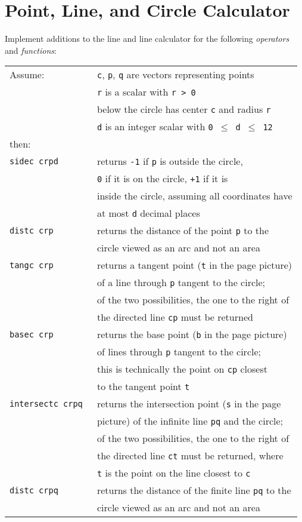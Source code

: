 \documentclass[12pt]{article}
\begin{document}
\section{Point, Line, and Circle Calculator}
Implement additions to the line and line calculator for
the following {\em operators} and {\em functions}:
\begin{center}
\begin{tabular}{l@{~~~~~}l}
Assume: & {\tt c}, {\tt p}, {\tt q} are vectors representing points \\
	& {\tt r} is a scalar with {\tt r > 0} \\
	& below the circle has center {\tt c} and radius {\tt r} \\
	& {\tt d} is an integer scalar with {\tt 0 $\leq$ d $\leq$ 12} \\
then: \\[1ex]
\tt sidec~crpd & returns {\tt -1} if {\tt p} is outside the circle, \\
               & {\tt 0} if it is on the circle, {\tt +1} if it is \\
	       & inside the circle, assuming all coordinates have \\
	       & at most {\tt d} decimal places \\
\tt distc crp  & returns the distance of the point {\tt p} to the  \\
               & circle viewed as an arc and not an area \\
\tt tangc crp  & returns a tangent point ({\tt t} in the page
                 \pageref{TANGENT-PICTURE} picture) \\
               & of a line through {\tt p} tangent to the circle; \\
	       & of the two possibilities, the one to the right of \\
	       & the directed line {\tt cp} must be returned \\
\tt basec crp  & returns the base point ({\tt b} in the page
                 \pageref{TANGENT-PICTURE} picture) \\
               & of lines through {\tt p} tangent to the circle; \\
	       & this is technically the point on {\tt cp} closest \\
	       & to the tangent point {\tt t} \\
\tt intersectc crpq  & returns the intersection point
                       ({\tt s} in the page \pageref{INTERSECTION-PICTURE} \\
               & picture) of the infinite line {\tt pq} and the circle; \\
	       & of the two possibilities, the one to the right of \\
	       & the directed line {\tt ct} must be returned, where \\
	       & {\tt t} is the point on the line closest to {\tt c} \\
\tt distc crpq  & returns the distance of the finite line {\tt pq} to the  \\
               & circle viewed as an arc and not an area \\
\end{tabular}
\end{center}
\end{document}
